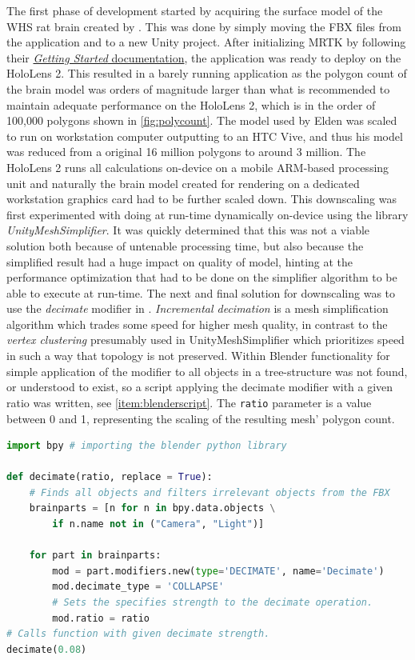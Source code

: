 The first phase of development started by acquiring the surface model of the WHS rat brain created by \citet{Elden2017}. This was done by simply moving the FBX files from the  application and to a new Unity project. After initializing MRTK by following their \href{https://microsoft.github.io/MixedRealityToolkit-Unity/version/releases/2.2.0/Documentation/GettingStartedWithTheMRTK.html}{\textit{Getting Started} documentation}, the application was ready to deploy on the HoloLens 2. This resulted in a barely running application as the polygon count of the brain model was orders of magnitude larger than what is recommended to maintain adequate performance on the HoloLens 2, which is in the order of 100,000 polygons shown in \autoref{fig:polycount}. The model used by Elden was scaled to run on workstation computer outputting to an HTC Vive, and thus his model was reduced from a original 16 million polygons to around 3 million. The HoloLens 2 runs all calculations on-device on a mobile ARM-based processing unit and naturally the brain model created for rendering on a dedicated workstation graphics card had to be further scaled down. 
This downscaling was first experimented with doing at run-time dynamically on-device using the library \textit{UnityMeshSimplifier}. It was quickly determined that this was not a viable solution both because of untenable processing time, but also because the simplified result had a huge impact on quality of model, hinting at the performance optimization that had to be done on the simplifier algorithm to be able to execute at run-time. The next and final solution for downscaling was to use the \textit{decimate} modifier in . \textit{Incremental decimation} is a mesh simplification algorithm which trades some speed for higher mesh quality, in contrast to the \textit{vertex clustering} presumably used in UnityMeshSimplifier which prioritizes speed in such a way that topology is not preserved. Within Blender functionality for simple application of the modifier to all objects in a tree-structure was not found, or understood to exist, so a script applying the decimate modifier with a given ratio was written, see \autoref{item:blenderscript}. The \texttt{ratio} parameter is a value between 0 and 1, representing the scaling of the resulting mesh' polygon count.

\begin{lstlisting}[language=python, label={item:blenderscript}, caption={Blender script applying a decimate modifier to all relevant objects in a scene.}]
import bpy # importing the blender python library

def decimate(ratio, replace = True):
    # Finds all objects and filters irrelevant objects from the FBX 
    brainparts = [n for n in bpy.data.objects \
        if n.name not in ("Camera", "Light")] 

    for part in brainparts:
        mod = part.modifiers.new(type='DECIMATE', name='Decimate')
        mod.decimate_type = 'COLLAPSE'
        # Sets the specifies strength to the decimate operation. 
        mod.ratio = ratio
# Calls function with given decimate strength.
decimate(0.08)
\end{lstlisting}

